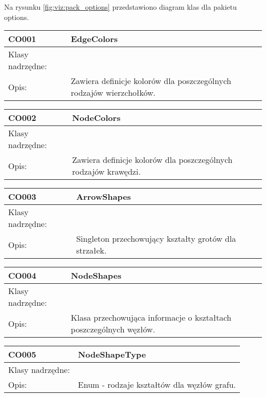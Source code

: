 Na rysunku  \figurename \space \ref{fig:viz:pack_options}  przedstawiono diagram klas dla pakietu options.







\begin{center}

\begin{longtable}{|m{3.5cm}|m{8.5cm}|} \hline

CO001 & EdgeColors \\ \hline
Klasy nadrzędne: &     \\ \hline
Opis: & Zawiera definicje kolorów dla poszczególnych rodzajów wierzchołków.   \\ \hline

\end{longtable}

\begin{longtable}{|m{3.5cm}|m{8.5cm}|} \hline

CO002 & NodeColors \\ \hline
Klasy nadrzędne: &     \\ \hline
Opis: & Zawiera definicje kolorów dla poszczególnych rodzajów krawędzi.   \\ \hline



\end{longtable}

\begin{longtable}{|m{3.5cm}|m{8.5cm}|} \hline

CO003 & ArrowShapes \\ \hline
Klasy nadrzędne: &     \\ \hline
Opis: & Singleton przechowujący kształty grotów dla strzałek.   \\ \hline


\end{longtable}

\begin{longtable}{|m{3.5cm}|m{8.5cm}|} \hline

CO004 & NodeShapes \\ \hline
Klasy nadrzędne: &     \\ \hline
Opis: & Klasa przechowująca informacje o kształtach poszczególnych węzłów.   \\ \hline

\end{longtable}

\begin{longtable}{|m{3.5cm}|m{8.5cm}|} \hline

CO005 & NodeShapeType \\ \hline
Klasy nadrzędne: &     \\ \hline
Opis: &  Enum - rodzaje kształtów dla węzłów grafu.   \\ \hline

\end{longtable}

\end{center}


